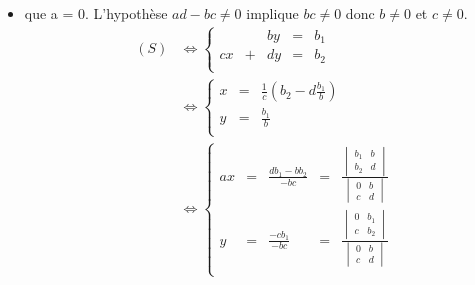\documentclass{article}
\begin{document}
\begin{question_kholle}
\begin{itemize}[label=$\bullet$ Supposons]
\begin{itemize}[label=$\bullet$ Supposons]
\begin{equation*}
\begin{aligned}
\begin{array}{ccccc}
						            y  & = & \frac{ab_2 - cb_1}{ad - bc} & = & \frac{\begin{vmatrix}a&b_1\\c&b_2\end{vmatrix}}{\begin{vmatrix}a&b\\c&d\end{vmatrix}} \\
					            \end{array}
					            \right.
				            \end{aligned}
			            \end{equation*}
			            Donc le système admet une unique solution qui est celle annoncée.

			      \item que a = 0. L'hypothèse $ad - bc \neq 0$ implique $bc \neq 0$ donc $b \neq 0$ et $c \neq 0$.
			            \begin{equation*}
				            \begin{aligned}
					            (S)
					             & \iff \left\{
					            \begin{array}{ccccc}
						               &   & by & = & b_1 \\
						            cx & + & dy & = & b_2 \\
					            \end{array}
					            \right.         \\
					             & \iff \left\{
					            \begin{array}{ccc}
						            x & = & \frac{1}{c} \left( b_2 - d\frac{b_1}{b} \right) \\
						            y & = & \frac{b_1}{b}                                   \\
					            \end{array}
					            \right.         \\
					             & \iff \left\{
					            \begin{array}{ccccc}
						            ax & = & \frac{db_1 - bb_2}{- bc} & = & \frac{\begin{vmatrix}b_1&b\\b_2&d\end{vmatrix}}{\begin{vmatrix}0&b\\c&d\end{vmatrix}} \\
						            y  & = & \frac{- cb_1}{- bc}      & = & \frac{\begin{vmatrix}0&b_1\\c&b_2\end{vmatrix}}{\begin{vmatrix}0&b\\c&d\end{vmatrix}} \\

\end{array}
\end{aligned}
\end{equation*}
\end{itemize}
\end{itemize}
\end{question_kholle}
\end{document}
